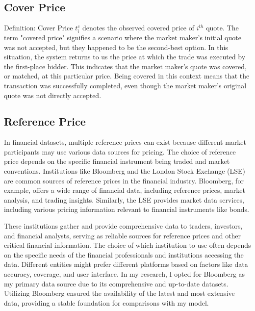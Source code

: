 \subsection{Cover Price}
Definition: Cover Price $t^c_i$ denotes the observed covered price of $i^{th}$ quote. The term "covered price" signifies a scenario where the market maker's initial quote was not accepted, but they happened to be the second-best option. In this situation, the system returns to us the price at which the trade was executed by the first-place bidder. This indicates that the market maker's quote was covered, or matched, at this particular price. Being covered in this context means that the transaction was successfully completed, even though the market maker's original quote was not directly accepted.

\subsection{Reference Price}
In financial datasets, multiple reference prices can exist because different market participants may use various data sources for pricing. The choice of reference price depends on the specific financial instrument being traded and market conventions. Institutions like Bloomberg and the London Stock Exchange (LSE) are common sources of reference prices in the financial industry. Bloomberg, for example, offers a wide range of financial data, including reference prices, market analysis, and trading insights. Similarly, the LSE provides market data services, including various pricing information relevant to financial instruments like bonds.

These institutions gather and provide comprehensive data to traders, investors, and financial analysts, serving as reliable sources for reference prices and other critical financial information. The choice of which institution to use often depends on the specific needs of the financial professionals and institutions accessing the data. Different entities might prefer different platforms based on factors like data accuracy, coverage, and user interface. In my research, I opted for Bloomberg as my primary data source due to its comprehensive and up-to-date datasets. Utilizing Bloomberg ensured the availability of the latest and most extensive data, providing a stable foundation for comparisons with my model.

